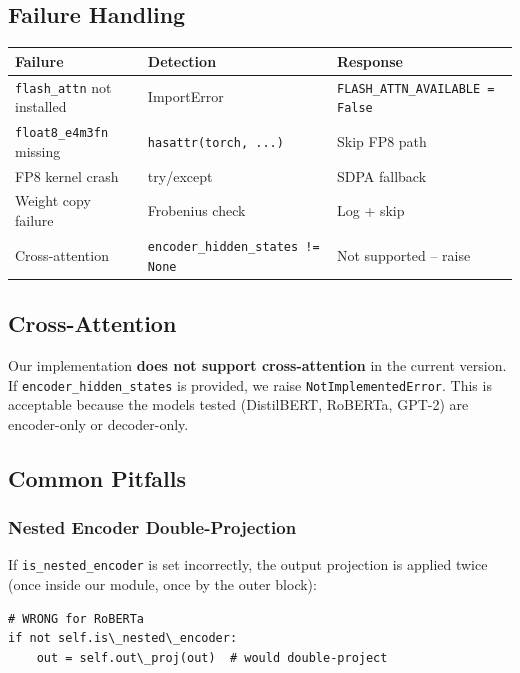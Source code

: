 \subsection{Failure Handling}

\begin{table}[H]
\centering
\small
\begin{tabular}{lll}
\toprule
\textbf{Failure} & \textbf{Detection} & \textbf{Response} \\
\midrule
\texttt{flash\_attn} not installed & ImportError & \texttt{FLASH\_ATTN\_AVAILABLE = False} \\
\texttt{float8\_e4m3fn} missing & \texttt{hasattr(torch, ...)} & Skip FP8 path \\
FP8 kernel crash & try/except & SDPA fallback \\
Weight copy failure & Frobenius check & Log + skip \\
Cross-attention & \texttt{encoder\_hidden\_states != None} & Not supported -- raise \\
\bottomrule
\end{tabular}
\end{table}

\subsection{Cross-Attention}

Our implementation \textbf{does not support cross-attention} in the current 
version. If \texttt{encoder\_hidden\_states} is provided, we raise 
\texttt{NotImplementedError}. This is acceptable because the models tested 
(DistilBERT, RoBERTa, GPT-2) are encoder-only or decoder-only.

\subsection{Common Pitfalls}

\subsubsection{Nested Encoder Double-Projection}

If \texttt{is\_nested\_encoder} is set incorrectly, the output projection is applied 
twice (once inside our module, once by the outer block):

\begin{lstlisting}
# WRONG for RoBERTa
if not self.is\_nested\_encoder:
    out = self.out\_proj(out)  # would double-project
\end{lstlisting}

